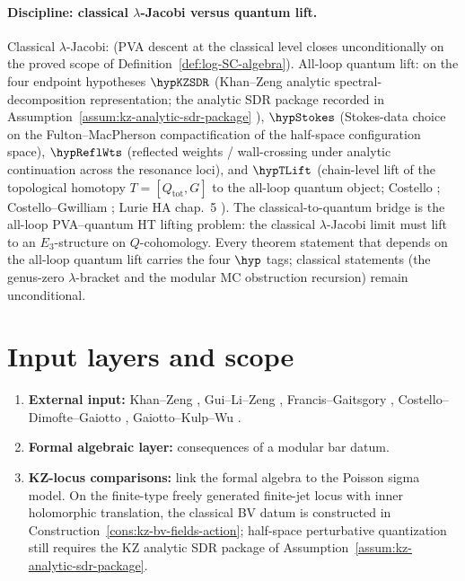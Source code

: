 \providecommand{\Tr}{\operatorname{Tr}}
\providecommand{\Def}{\operatorname{Def}}
\label{ch:modular-pva-quantization}%
\label{chap:modular-pva}%
\label{def:complete-modular-bar}%

\paragraph{Discipline: classical $\lambda$-Jacobi versus quantum lift.}
Classical $\lambda$-Jacobi: \ClaimStatusProvedHere{} (PVA descent at
the classical level closes unconditionally on the proved scope of
Definition~\ref{def:log-SC-algebra}). All-loop quantum lift:
\ClaimStatusConditional{} on the four endpoint hypotheses
$\hypKZSDR$ (Khan--Zeng analytic spectral-decomposition representation;
the analytic SDR package recorded in
Assumption~\ref{assum:kz-analytic-sdr-package} \cite{KZ25}),
$\hypStokes$ (Stokes-data choice on the Fulton--MacPherson
compactification of the half-space configuration space),
$\hypReflWts$ (reflected weights / wall-crossing under analytic
continuation across the resonance loci), and $\hypTLift$
(chain-level lift of the topological homotopy
$T = [Q_{\mathrm{tot}}, G]$ to the all-loop quantum object;
Costello \cite{Costello2011Renorm}; Costello--Gwilliam \cite{CG17};
Lurie HA chap.~5 \cite{LurieHA}). The classical-to-quantum bridge is
the all-loop PVA--quantum HT lifting problem: the classical
$\lambda$-Jacobi limit must lift to an $E_3$-structure on
$Q$-cohomology. Every theorem statement that depends on the all-loop
quantum lift carries the four $\hyp$ tags;
classical statements (the genus-zero $\lambda$-bracket and the modular
MC obstruction recursion) remain unconditional.

\section{Input layers and scope}

\begin{convention}
\label{conv:three-levels}
\begin{enumerate}[leftmargin=2.4em]
\item \textbf{External input:} Khan--Zeng \cite{KZ25}, Gui--Li--Zeng \cite{GLZ22}, Francis--Gaitsgory \cite{FG12}, Costello--Dimofte--Gaiotto \cite{CDG20}, Gaiotto--Kulp--Wu \cite{GKW25}.
\item \textbf{Formal algebraic layer:} consequences of a modular bar datum.
\item \textbf{KZ-locus comparisons:} link the formal algebra to the Poisson sigma model. On the finite-type freely generated finite-jet locus with inner holomorphic translation, the classical BV datum is constructed in Construction~\ref{cons:kz-bv-fields-action}; half-space perturbative quantization still requires the KZ analytic SDR package of Assumption~\ref{assum:kz-analytic-sdr-package}.
\end{enumerate}
\end{convention}

